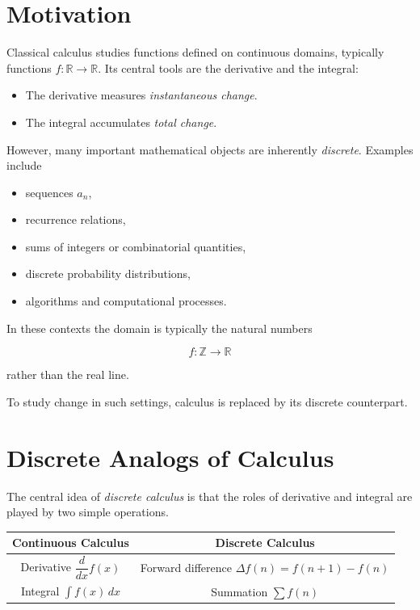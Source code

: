 
\section*{Motivation}

Classical calculus studies functions defined on continuous domains, typically
functions \(f : \mathbb{R} \to \mathbb{R}\).
Its central tools are the derivative and the integral:

\begin{itemize}
\item The derivative measures \emph{instantaneous change}.
\item The integral accumulates \emph{total change}.
\end{itemize}

However, many important mathematical objects are inherently \emph{discrete}.
Examples include

\begin{itemize}
\item sequences \(a_n\),
\item recurrence relations,
\item sums of integers or combinatorial quantities,
\item discrete probability distributions,
\item algorithms and computational processes.
\end{itemize}

In these contexts the domain is typically the natural numbers

\[
f : \mathbb{Z} \to \mathbb{R}
\]

rather than the real line.

To study change in such settings, calculus is replaced by its discrete
counterpart.

\section*{Discrete Analogs of Calculus}

The central idea of \emph{discrete calculus} is that the roles of derivative and
integral are played by two simple operations.

\begin{tcolorbox}[colback=gray!6, colframe=gray!40, arc=2pt,
  left=6pt, right=6pt, top=4pt, bottom=4pt,
  title={\small\textbf{Continuous vs.\ Discrete Calculus}},
  fonttitle=\small\bfseries]
\renewcommand{\arraystretch}{1.4}
\begin{tabular}{@{}c|c@{}}
\textbf{Continuous Calculus} & \textbf{Discrete Calculus} \\
\hline
Derivative \( \dfrac{d}{dx} f(x) \) & Forward difference \( \Delta f(n) = f(n+1)-f(n) \) \\[6pt]
Integral \( \displaystyle\int f(x)\,dx \) & Summation \( \displaystyle\sum f(n) \)
\end{tabular}
\end{tcolorbox}

